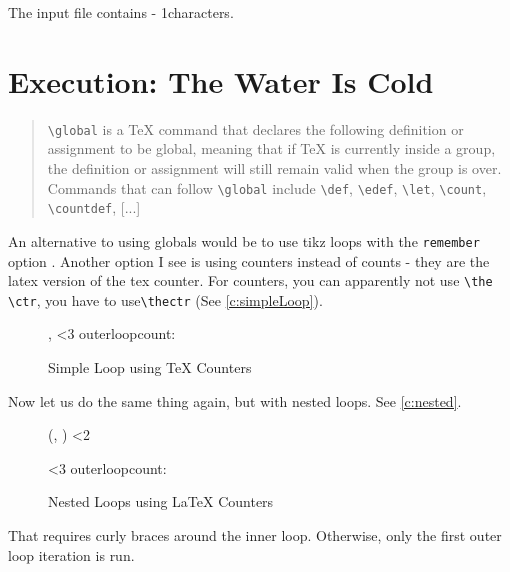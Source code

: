 \documentclass{article} \usepackage[utf8]{inputenc}
\newif\ifrunpartone
\begin{document}
\def\stahp{\inputstringlength}

\def\stahpnow{\the\numexpr \stahp - 1}

The input file contains \stahpnow characters.

\ifrunpartone
\section{ Execution: The Water Is Cold}
\begin{myquote}\begin{quote}
\texttt{\textbackslash global} is a TeX command that declares the following definition or assignment to be global, meaning that if TeX is currently inside a group, the definition or assignment will still remain valid when the group is over. Commands that can follow \texttt{\textbackslash global} include \texttt{\textbackslash def}, \texttt{\textbackslash edef}, \texttt{\textbackslash let}, \texttt{\textbackslash count}, \texttt{\textbackslash countdef}, [...]\\
\end{quote}\end{myquote}
An alternative to using globals would be to use tikz loops with the \texttt{remember} option . Another option I see is using counters instead of counts - they are the latex version of the tex counter. For counters, you can apparently not use \texttt{\textbackslash the \textbackslash ctr}, you have to use\texttt{\textbackslash thectr} (See \autoref{c:simpleLoop}).
\begin{figure}
\begin{mycode}
\setcounter{outerloopcounter}{0}
\loop
    	\addtocounter{outerloopcounter}{1}
           \theouterloopcounter ,
           \ifnum \value{outerloopcounter}<3
\repeat
outerloopcount: \theouterloopcounter
\end{mycode}
\caption{Simple Loop using TeX Counters}
\label{c:simpleLoop}
\end{figure}

Now let us do the same thing again, but with nested loops. See \autoref{c:nested}.
\begin{figure}[htbp]
\begin{mycode}
\setcounter{outerloopcounter}{0}
\loop
	\setcounter{innerloopcounter}{0}
    	\addtocounter{outerloopcounter}{1}
	
	{\loop
	\addtocounter{innerloopcounter}{1}
           (\theouterloopcounter , \theinnerloopcounter )
	\ifnum \value{innerloopcounter}<2
           \repeat }

           \ifnum \value{outerloopcounter}<3
\repeat
outerloopcount: \theouterloopcounter
\end{mycode}
\caption{Nested Loops using LaTeX Counters}
\label{c:nested}
\end{figure}
That requires curly braces around the inner loop. Otherwise, only the first outer loop iteration is run.
\end{document}
